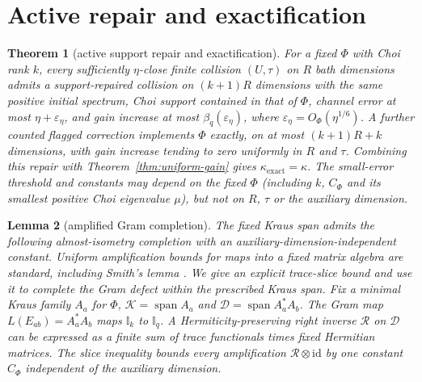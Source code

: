 \documentclass[11pt,a4paper]{article}
\numberwithin{equation}{section}
\theoremstyle{plain}
\newtheorem{theorem}{Theorem}[section]
\newtheorem{lemma}[theorem]{Lemma}
\theoremstyle{definition}
\newcommand{\id}{\mathrm{id}}
\newcommand{\one}{\mathbb{I}}
\newcommand{\Rmap}{\mathcal{R}}            %
\newcommand{\kexact}{\kappa_{\mathrm{exact}}}
\begin{document}
\section{Active repair and exactification}
\label{sec:repair}

\begin{theorem}[active support repair and exactification]
\label{thm:active-repair}
For a fixed $\Phi$ with Choi rank $k$, every sufficiently $\eta$-close finite
collision $(U,\tau)$ on $R$ bath dimensions admits a support-repaired
collision on $(k+1)R$ dimensions with the same positive initial spectrum, Choi
support contained in that of $\Phi$, channel error at most
$\eta+\varepsilon_\eta$, and gain increase at most
$\beta_q(\varepsilon_\eta)$, where
$\varepsilon_\eta=O_\Phi(\eta^{1/6})$. A further counted flagged correction
implements $\Phi$ exactly, on at most $(k+1)R+k$ dimensions, with gain
increase tending to zero uniformly in $R$ and $\tau$. Combining this repair
with Theorem~\ref{thm:uniform-gain} gives $\kexact=\kappa$. The small-error
threshold and constants may depend on the fixed $\Phi$ (including $k$,
$C_\Phi$ and its smallest positive Choi eigenvalue $\mu$), but not on $R$,
$\tau$ or the auxiliary dimension.
\end{theorem}

\begin{lemma}[amplified Gram completion]
\label{lem:gram-completion}
The fixed Kraus span admits the following almost-isometry completion with an
auxiliary-dimension-independent constant. Uniform amplification bounds for maps
into a fixed matrix algebra are standard, including Smith's lemma
\cite{Smith1983}. We give an explicit trace-slice bound and use it to complete
the Gram defect within the prescribed Kraus span. Fix a minimal Kraus family $A_a$ for
$\Phi$, $\mathcal{K}=\operatorname{span}A_a$ and
$\mathcal{D}=\operatorname{span}A_a^*A_b$. The Gram map $L(E_{ab})=A_a^*A_b$
maps $\one_k$ to $\one_q$. A Hermiticity-preserving right inverse $\Rmap$ on
$\mathcal{D}$ can be expressed as a finite sum of trace functionals times
fixed Hermitian matrices. The slice inequality bounds every amplification
$\Rmap\otimes\id$ by one constant $C_\Phi$ independent of the auxiliary
dimension.
\end{lemma}
\end{document}
